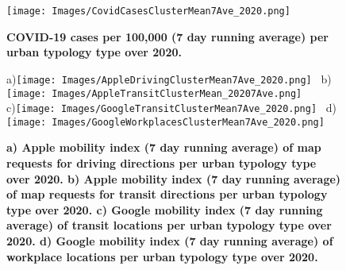 \documentclass[preprint,12pt]{elsarticle}
\begin{document}
\begin{figure}
\centering
\texttt{[image: Images/CovidCasesClusterMean7Ave\_2020.png]}
\caption{\bf  COVID-19 cases per 100,000 (7 day running average) per urban typology type over 2020.}
 \label{fig:covidcases}
\end{figure}




\begin{figure}
{\tiny a)}\texttt{[image: Images/AppleDrivingClusterMean7Ave\_2020.png]}~
{\tiny b)}\texttt{[image: Images/AppleTransitClusterMean\_20207Ave.png]}
\\
{\tiny c)}\texttt{[image: Images/GoogleTransitClusterMean7Ave\_2020.png]}~
{\tiny d)}\texttt{[image: Images/GoogleWorkplacesClusterMean7Ave\_2020.png]}
\caption{\bf a) Apple mobility index (7 day running average) of map requests for driving directions per urban typology type over 2020. b) Apple mobility index (7 day running average) of map requests for transit directions per urban typology type over 2020. c) Google mobility index (7 day running average) of transit locations per urban typology type over 2020. d) Google mobility index (7 day running average) of workplace locations per urban typology type over 2020.}
 \label{fig:driving}
\end{figure}



%
%
%
\end{document}
